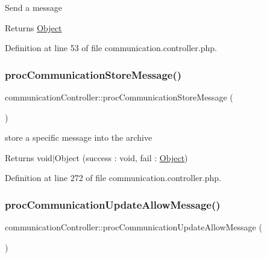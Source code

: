 Send a message \begin{DoxyReturn}{Returns}
\hyperlink{classObject}{Object} 
\end{DoxyReturn}


Definition at line 53 of file communication.\+controller.\+php.

\hypertarget{classcommunicationController_a50a2908615212e7774c1eff13df4897e}{}\label{classcommunicationController_a50a2908615212e7774c1eff13df4897e} 
\subsubsection{\texorpdfstring{proc\+Communication\+Store\+Message()}{procCommunicationStoreMessage()}}
{\footnotesize\ttfamily communication\+Controller\+::proc\+Communication\+Store\+Message (\begin{DoxyParamCaption}{ }\end{DoxyParamCaption})}

store a specific message into the archive \begin{DoxyReturn}{Returns}
void$\vert$\+Object (success \+: void, fail \+: \hyperlink{classObject}{Object}) 
\end{DoxyReturn}


Definition at line 272 of file communication.\+controller.\+php.

\hypertarget{classcommunicationController_a22b9183c8d27ba9035d7b3a38cda696a}{}\label{classcommunicationController_a22b9183c8d27ba9035d7b3a38cda696a} 
\subsubsection{\texorpdfstring{proc\+Communication\+Update\+Allow\+Message()}{procCommunicationUpdateAllowMessage()}}
{\footnotesize\ttfamily communication\+Controller\+::proc\+Communication\+Update\+Allow\+Message (\begin{DoxyParamCaption}{ }\end{DoxyParamCaption})}

